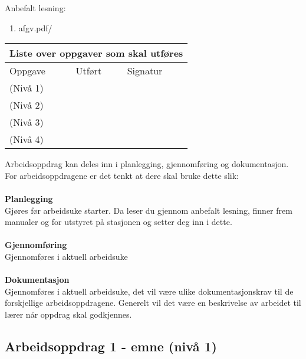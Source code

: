 Anbefalt lesning:

\begin{enumerate}
	\item afgv.pdf/ 
\end{enumerate}


\begin{center}
\begin{tabular}{ | m{10cm} | m{1cm}| m{2cm} | } 
\hline
\multicolumn{3}{|c|}{Liste over oppgaver som skal utføres} \\
	\hline
	Oppgave	& Utført & Signatur \\ 
	\hline
	\hline
	\cellcolor{green!60}(Nivå 1)	& & \\ 
	\hline
	\cellcolor{yellow!60}(Nivå 2)	& & \\ 
	\hline
	\cellcolor{orange!60}(Nivå 3)	& & \\ 
	\hline
	\cellcolor{red!60}(Nivå 4)	& & \\ 
	\hline
\end{tabular}
\end{center}

Arbeidsoppdrag kan deles inn i planlegging, gjennomføring og dokumentasjon.\\
For arbeidsoppdragene er det tenkt at dere skal bruke dette slik:\\\\
\textbf{Planlegging}\\
Gjøres før arbeidsuke starter. Da leser du gjennom anbefalt lesning, finner frem manualer og for  utstyret på stasjonen og setter deg inn i dette.\\ \\
\textbf{Gjennomføring}\\
Gjennomføres i aktuell arbeidsuke\\\\

\textbf{Dokumentasjon}\\
Gjennomføres i aktuell arbeidsuke, det vil være ulike dokumentasjonskrav til de forskjellige arbeidsoppdragene. Generelt vil det være en beskrivelse av arbeidet til lærer når oppdrag skal godkjennes. \\


\newpage

\subsection*{Arbeidsoppdrag 1 -  emne (nivå 1)}


